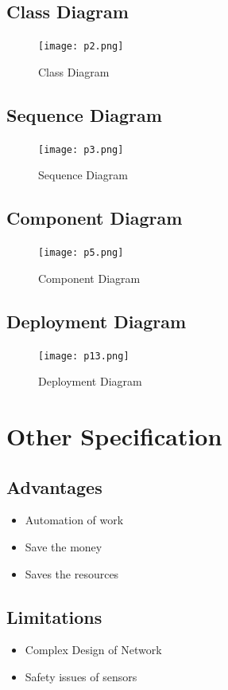 \documentclass[a4paper,12pt]{report}
\begin{document}
\begin{itemize}
\section{Class Diagram}
\begin{figure}[H]
  \texttt{[image: p2.png]}
  \caption{Class Diagram}
  \label{fig:boat1}
\end{figure}

\section{Sequence Diagram}
\begin{figure}[H]
  \texttt{[image: p3.png]}
  \caption{Sequence Diagram}
  \label{fig:boat1}
\end{figure}

\section{Component Diagram}
\begin{figure}[H]
  \texttt{[image: p5.png]}
  \caption{Component Diagram}
  \label{fig:boat1}
\end{figure}


\section{Deployment Diagram}
\begin{figure}[H]
  \texttt{[image: p13.png]}
  \caption{Deployment Diagram}
  \label{fig:boat1}
\end{figure}


\chapter {Other Specification}
\section{Advantages}
\begin{itemize}
\item Automation of work
\item  Save the money
\item  Saves the resources
\end{itemize}


\section{Limitations}
\begin{itemize}
\item  Complex Design of Network
\item  Safety issues of sensors
\end{itemize}


\end{itemize}
\end{document}
